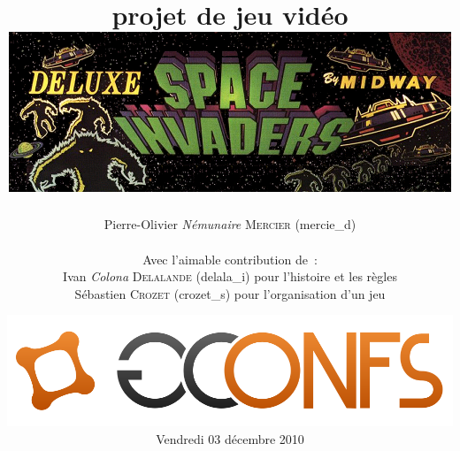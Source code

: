 \documentclass[12pt,a4paper]{report}
\begin{document}
\title{
  \vspace{1cm}
  \textbf{\Huge{\Tp{} projet de jeu vidéo }}\\
  \vspace{1cm}
  \includegraphics[scale=0.75]{images/logo.png}
}
\author{
  \Large{Pierre-Olivier \textit{Némunaire} \textsc{Mercier} ({\ttfamily mercie\_d})}\\\\
  Avec l'aimable contribution de~:\\
  Ivan \textit{Colona} \textsc{Delalande} ({\ttfamily delala\_i}) pour l'histoire et les règles\\
  Sébastien \textsc{Crozet} ({\ttfamily crozet\_s}) pour l'organisation d'un jeu
}
\date{
  \includegraphics[scale=0.5]{images/gconfs.png}\\
  \vspace{0.5cm}
  Vendredi 03 décembre 2010
}

\maketitle

\tableofcontents




















\appendix





\end{document}
